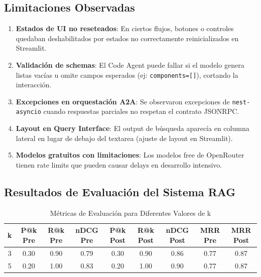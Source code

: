 \documentclass[12pt,a4paper]{article}
\begin{document}
\subsection{Limitaciones Observadas}

\begin{enumerate}
    \item \textbf{Estados de UI no reseteados}: En ciertos flujos, botones o controles quedaban deshabilitados por estados no correctamente reinicializados en Streamlit.
    
    \item \textbf{Validación de schemas}: El Code Agent puede fallar si el modelo genera listas vacías u omite campos esperados (ej: \texttt{components=[]}), cortando la interacción.
    
    \item \textbf{Excepciones en orquestación A2A}: Se observaron excepciones de \texttt{nest-asyncio} cuando respuestas parciales no respetan el contrato JSONRPC.
    
    \item \textbf{Layout en Query Interface}: El output de búsqueda aparecía en columna lateral en lugar de debajo del textarea (ajuste de layout en Streamlit).
    
    \item \textbf{Modelos gratuitos con limitaciones}: Los modelos free de OpenRouter tienen rate limits que pueden causar delays en desarrollo intensivo.
\end{enumerate}

\subsection{Resultados de Evaluación del Sistema RAG}

\begin{table}[H]
\centering
\caption{Métricas de Evaluación para Diferentes Valores de k}
\label{tab:metricas}
\begin{tabular}{ccccccccc}
\toprule
\textbf{k} & \textbf{P@k Pre} & \textbf{R@k Pre} & \textbf{nDCG Pre} & \textbf{P@k Post} & \textbf{R@k Post} & \textbf{nDCG Post} & \textbf{MRR Pre} & \textbf{MRR Post} \\
\midrule
3 & 0.30 & 0.90 & 0.79 & 0.30 & 0.90 & 0.86 & 0.77 & 0.87 \\
5 & 0.20 & 1.00 & 0.83 & 0.20 & 1.00 & 0.90 & 0.77 & 0.87 \\
\bottomrule
\end{tabular}
\end{table}
\end{document}

